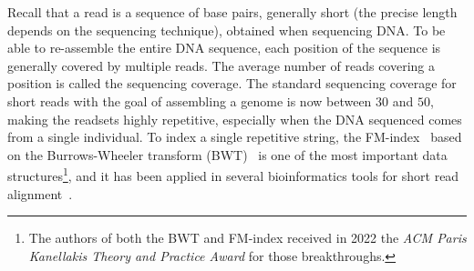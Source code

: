 Recall that a read is a sequence of base pairs, generally short (the precise length depends on the sequencing technique), obtained when sequencing DNA. To be able to re-assemble the entire DNA sequence, each position of the sequence is generally covered by multiple reads. The average number of reads covering a position is called the sequencing coverage.
The standard sequencing coverage for short reads with the goal of assembling a genome is now between $30$ and $50$, making the readsets highly repetitive, especially when the DNA sequenced comes from a single individual.
To index a single repetitive string, the FM-index~\cite{ferragina2005indexing} based on the Burrows-Wheeler transform (BWT)~\cite{burrows1994block} is one of the most important data structures\footnote{The authors of both the BWT and FM-index received in 2022 the \textit{ACM Paris Kanellakis Theory and Practice Award} for those breakthroughs.}, and it has been applied in several bioinformatics tools for short read alignment~\cite{langmead2009ultrafast,langmead2012fast,li2009fast}.

